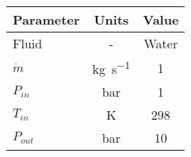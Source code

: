 \begin{tabular}{|p{2.5cm} c c|}
    \hline
    \rowcolor{bluepoli!40} %
    \textbf{Parameter} & \textbf{Units} & \textbf{Value} \T\B \\
    \hline \hline
    Fluid & - & Water \T\B\\
    \(\Dot{m}\)  & \unit{\kg\per\s} & \num{1} \T\B\\
    \(P_{in}\) & \unit{\bar} & \num{1} \T\B\\
    \(T_{in}\) & \unit{\K} & \num{298} \T\B\\
    \(P_{out}\) & \unit{\bar} & \num{10} \T\B\\
    \hline
\end{tabular}